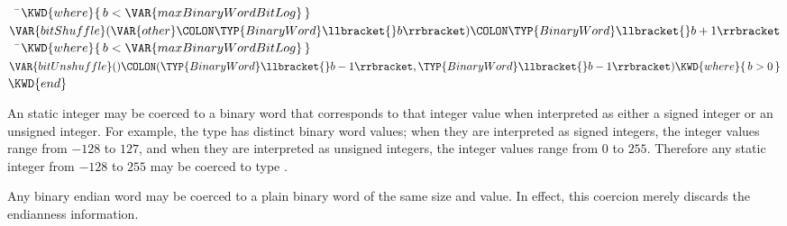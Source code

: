 \begin{Fortress}
{\tt~~}\pushtabs\=\+\(    \KWD{where} \{\,b < \VAR{maxBinaryWordBitLog}\,\}\)\-\\\poptabs
\(  \VAR{bitShuffle}(\VAR{other}\COLON \TYP{BinaryWord}\llbracket{}b\rrbracket)\COLON \TYP{BinaryWord}\llbracket{}b+1\rrbracket\)\\
{\tt~~}\pushtabs\=\+\(    \KWD{where} \{\,b < \VAR{maxBinaryWordBitLog}\,\}\)\-\\\poptabs
\(  \VAR{bitUnshuffle}()\COLON (\TYP{BinaryWord}\llbracket{}b-1\rrbracket, \TYP{BinaryWord}\llbracket{}b-1\rrbracket) \KWD{where} \{\,b > 0\,\}\)\-\\\poptabs
\(\KWD{end}\)
\end{Fortress}



An static integer may be coerced to a binary word that corresponds to
that integer value when interpreted as either a signed integer or an unsigned integer.
For example, the type  has  distinct
binary word values; when they are interpreted as signed integers, the integer values range from $-128$ to $127$,
and when they are interpreted as unsigned integers, the integer values range from $0$ to $255$.
Therefore any static integer from $-128$ to $255$ may be coerced to type .



Any binary endian word may be coerced to a plain binary word of the same size and value.
In effect, this coercion merely discards the endianness information.



